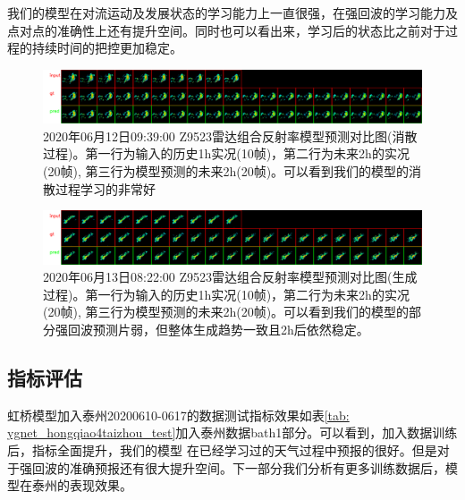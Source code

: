 \documentclass[10pt,english, openany]{book}
\begin{document}
\begin{center}
\end{center}

我们的模型在对流运动及发展状态的学习能力上一直很强，在强回波的学习能力及点对点的准确性上还有提升空间。同时也可以看出来，学习后的状态比之前对于过程的持续时间的把控更加稳定。

\begin{figure}
	\centering
	\centering \includegraphics[scale=0.18]{Z_RADR_I_Z9523_20200612093900_O_DOR_SA_CAP.png}
	\caption{2020年06月12日09:39:00 Z9523雷达组合反射率模型预测对比图(消散过程)。第一行为输入的历史1h实况(10帧)，第二行为未来2h的实况(20帧), 第三行为模型预测的未来2h(20帧)。可以看到我们的模型的消散过程学习的非常好}
	\label{fig:sample3}
\end{figure}

\begin{figure}
	\centering
	\centering \includegraphics[scale=0.18]{Z_RADR_I_Z9523_20200613082200_O_DOR_SA_CAP.png}
	\caption{2020年06月13日08:22:00 Z9523雷达组合反射率模型预测对比图(生成过程)。第一行为输入的历史1h实况(10帧)，第二行为未来2h的实况(20帧), 第三行为模型预测的未来2h(20帧)。可以看到我们的模型的部分强回波预测片弱，但整体生成趋势一致且2h后依然稳定。}
	\label{fig:sample4}
\end{figure}

\subsection{指标评估}

虹桥模型加入泰州20200610-0617的数据测试指标效果如表\ref{tab: ygnet_hongqiao4taizhou_test}加入泰州数据bath1部分。可以看到，加入数据训练后，指标全面提升，我们的模型
在已经学习过的天气过程中预报的很好。但是对于强回波的准确预报还有很大提升空间。下一部分我们分析有更多训练数据后，模型在泰州的表现效果。
\end{document}
